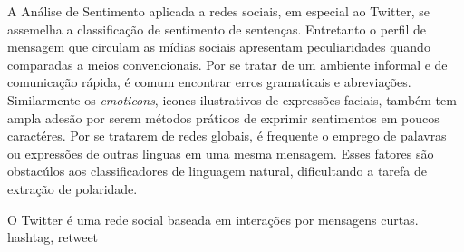 A Análise de Sentimento aplicada a redes sociais, em especial ao Twitter, se
assemelha a classificação de sentimento de sentenças.
Entretanto o perfil de mensagem que circulam as mídias sociais apresentam
peculiaridades quando comparadas a meios convencionais.
Por se tratar de um ambiente informal e de comunicação rápida, é comum encontrar
erros gramaticais e abreviações.
Similarmente os \textit{emoticons}, icones ilustrativos de expressões faciais,
também tem ampla adesão por serem métodos práticos de exprimir sentimentos em
poucos caractéres.
Por se tratarem de redes globais, é frequente o emprego de palavras ou
expressões de outras linguas em uma mesma mensagem.
Esses fatores são obstacúlos aos classificadores de linguagem natural,
dificultando a tarefa de extração de polaridade.

O Twitter é uma rede social baseada em interações por mensagens curtas.
hashtag, retweet



%


